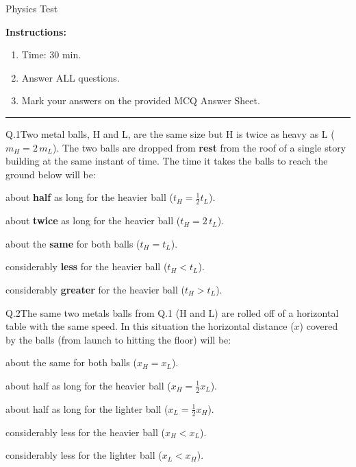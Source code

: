



    \begin{center}{\Huge Physics Test}\end{center}

    \eline[]
    \textbf{Instructions:}
    \begin{enumerate}
        \item Time: 30 min.
        \item Answer ALL questions.
        \item Mark your answers on the provided MCQ Answer Sheet.
    \end{enumerate}
    \begin{center}\rule{0.7\textwidth}{0.5pt}\end{center}

    \begin{mcq}{Q.1}{Two metal balls, H and L, are the same size but H is twice as heavy as L ($m_H = 2 \, m_L$). The two balls are dropped from \textbf{rest} from the roof of a single story building at the same instant of time. The time it takes the balls to reach the ground below will be:}

        \item about \textbf{half} as long for the heavier ball ($\displaystyle t_H = \frac{1}{2} t_L$).
        \item about \textbf{twice} as long for the heavier ball ($\displaystyle t_H = 2 \, t_L$).
        \item about the \textbf{same} for both balls ($t_H = t_L$).
        \item considerably \textbf{less} for the heavier ball ($t_H < t_L$).
        \item considerably \textbf{greater} for the heavier ball ($t_H > t_L$).
    \end{mcq}


    \begin{mcq}{Q.2}{The same two metals balls from Q.1 (H and L) are rolled off of a horizontal table with the same speed. In this situation the horizontal distance ($x$) covered by the balls (from launch to hitting the floor) will be:}

            \item about the same for both balls ($x_H = x_L$).
            \item about half as long for the heavier ball ($\displaystyle x_H = \frac{1}{2} x_L$).
            \item about half as long for the lighter ball ($\displaystyle x_L = \frac{1}{2} x_H$).
            \item considerably less for the heavier ball ($x_H < x_L$).
            \item considerably less for the lighter ball ($x_L < x_H$).
    \end{mcq}


